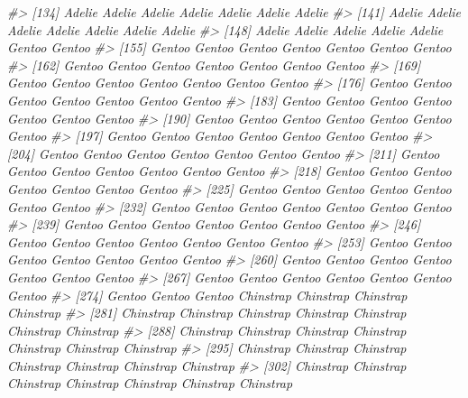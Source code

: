 \documentclass[
  12pt,
]{book}
\newenvironment{Shaded}{\begin{snugshade}}{\end{snugshade}}
\newcommand{\CommentTok}[1]{\textcolor[rgb]{0.56,0.35,0.01}{\textit{#1}}}
\begin{document}
\begin{Shaded}
\begin{Highlighting}[]
\CommentTok{\#\textgreater{} [134] Adelie    Adelie    Adelie    Adelie    Adelie    Adelie    Adelie   }
\CommentTok{\#\textgreater{} [141] Adelie    Adelie    Adelie    Adelie    Adelie    Adelie    Adelie   }
\CommentTok{\#\textgreater{} [148] Adelie    Adelie    Adelie    Adelie    Adelie    Gentoo    Gentoo   }
\CommentTok{\#\textgreater{} [155] Gentoo    Gentoo    Gentoo    Gentoo    Gentoo    Gentoo    Gentoo   }
\CommentTok{\#\textgreater{} [162] Gentoo    Gentoo    Gentoo    Gentoo    Gentoo    Gentoo    Gentoo   }
\CommentTok{\#\textgreater{} [169] Gentoo    Gentoo    Gentoo    Gentoo    Gentoo    Gentoo    Gentoo   }
\CommentTok{\#\textgreater{} [176] Gentoo    Gentoo    Gentoo    Gentoo    Gentoo    Gentoo    Gentoo   }
\CommentTok{\#\textgreater{} [183] Gentoo    Gentoo    Gentoo    Gentoo    Gentoo    Gentoo    Gentoo   }
\CommentTok{\#\textgreater{} [190] Gentoo    Gentoo    Gentoo    Gentoo    Gentoo    Gentoo    Gentoo   }
\CommentTok{\#\textgreater{} [197] Gentoo    Gentoo    Gentoo    Gentoo    Gentoo    Gentoo    Gentoo   }
\CommentTok{\#\textgreater{} [204] Gentoo    Gentoo    Gentoo    Gentoo    Gentoo    Gentoo    Gentoo   }
\CommentTok{\#\textgreater{} [211] Gentoo    Gentoo    Gentoo    Gentoo    Gentoo    Gentoo    Gentoo   }
\CommentTok{\#\textgreater{} [218] Gentoo    Gentoo    Gentoo    Gentoo    Gentoo    Gentoo    Gentoo   }
\CommentTok{\#\textgreater{} [225] Gentoo    Gentoo    Gentoo    Gentoo    Gentoo    Gentoo    Gentoo   }
\CommentTok{\#\textgreater{} [232] Gentoo    Gentoo    Gentoo    Gentoo    Gentoo    Gentoo    Gentoo   }
\CommentTok{\#\textgreater{} [239] Gentoo    Gentoo    Gentoo    Gentoo    Gentoo    Gentoo    Gentoo   }
\CommentTok{\#\textgreater{} [246] Gentoo    Gentoo    Gentoo    Gentoo    Gentoo    Gentoo    Gentoo   }
\CommentTok{\#\textgreater{} [253] Gentoo    Gentoo    Gentoo    Gentoo    Gentoo    Gentoo    Gentoo   }
\CommentTok{\#\textgreater{} [260] Gentoo    Gentoo    Gentoo    Gentoo    Gentoo    Gentoo    Gentoo   }
\CommentTok{\#\textgreater{} [267] Gentoo    Gentoo    Gentoo    Gentoo    Gentoo    Gentoo    Gentoo   }
\CommentTok{\#\textgreater{} [274] Gentoo    Gentoo    Gentoo    Chinstrap Chinstrap Chinstrap Chinstrap}
\CommentTok{\#\textgreater{} [281] Chinstrap Chinstrap Chinstrap Chinstrap Chinstrap Chinstrap Chinstrap}
\CommentTok{\#\textgreater{} [288] Chinstrap Chinstrap Chinstrap Chinstrap Chinstrap Chinstrap Chinstrap}
\CommentTok{\#\textgreater{} [295] Chinstrap Chinstrap Chinstrap Chinstrap Chinstrap Chinstrap Chinstrap}
\CommentTok{\#\textgreater{} [302] Chinstrap Chinstrap Chinstrap Chinstrap Chinstrap Chinstrap Chinstrap}

\end{Highlighting}
\end{Shaded}
\end{document}
